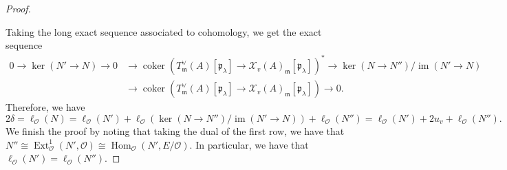 \documentclass[10pt,a4paper]{amsart}
\newcommand{\Ext}{\operatorname{Ext}} %
\newcommand{\Hom}{\operatorname{Hom}} %
\newcommand{\coker}{\operatorname{coker}} %
\newcommand{\im}{\operatorname{im}} %
\begin{document}
\begin{proof}
\begin{center}
    \end{center}
    Taking the long exact sequence associated to cohomology, we get the exact sequence
    \begin{align*}
        0 \to \ker( N'\to N) \to 0 &\to \coker( T^\vee_{\mathfrak{m}}(A)[\mathfrak{p}_\lambda] \to \mathcal{X}_v(A)_{\mathfrak{m}}[\mathfrak{p}_\lambda])^* \to \ker(N\to N'')/\im(N'\to N)
        \\ &\to \coker( T^\vee_{\mathfrak{m}}(A)[\mathfrak{p}_\lambda] \to \mathcal{X}_v(A)_{\mathfrak{m}}[\mathfrak{p}_\lambda]) \to 0.
    \end{align*}
    Therefore, we have 
$$2\delta=\ell_{\mathcal{O}}(N)=\ell_{\mathcal{O}}(N')+\ell_{\mathcal{O}}(\ker(N\to N'')/\im(N'\to N))+\ell_{\mathcal{O}}(N'')= \ell_{\mathcal{O}}(N')+2u_v+\ell_{\mathcal{O}}(N'').$$
We finish the proof by noting that
taking the dual of the first row, we have that $N''\cong \Ext^1_{\mathcal{O}}(N',\mathcal{O})\cong \Hom_{\mathcal{O}}(N',E/\mathcal{O})$. In particular, we have that $\ell_{\mathcal{O}}(N')=\ell_{\mathcal{O}}(N'')$.
\end{proof}
\end{document}
